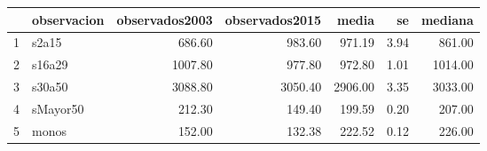 \begin{table}[ht]
\centering
\begin{tabular}{rlrrrrr}
  \hline
 & observacion & observados2003 & observados2015 & media & se & mediana \\ 
  \hline
1 & s2a15 & 686.60 & 983.60 & 971.19 & 3.94 & 861.00 \\ 
  2 & s16a29 & 1007.80 & 977.80 & 972.80 & 1.01 & 1014.00 \\ 
  3 & s30a50 & 3088.80 & 3050.40 & 2906.00 & 3.35 & 3033.00 \\ 
  4 & sMayor50 & 212.30 & 149.40 & 199.59 & 0.20 & 207.00 \\ 
  5 & monos & 152.00 & 132.38 & 222.52 & 0.12 & 226.00 \\ 
   \hline
\end{tabular}
\end{table}
